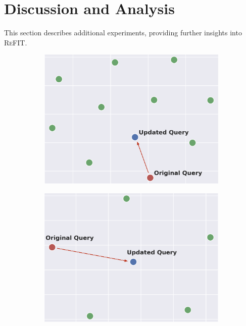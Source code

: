 \section{Discussion and Analysis}

This section describes additional experiments, providing further insights into \textsc{ReFIT}.

\begin{figure}[t]
    \centering
    \begin{subfigure}[c]{0.24\linewidth}
        \centering
     \includegraphics[width=1\linewidth]{submissions/Revanth2024/figures/qvec_1.png}
     \label{fig:qvec_1}
    \end{subfigure}
    \begin{subfigure}[c]{0.24\linewidth}
        \centering
     \includegraphics[width=1\linewidth]{submissions/Revanth2024/figures/qvec_2.png}

\end{subfigure}
\end{figure}
